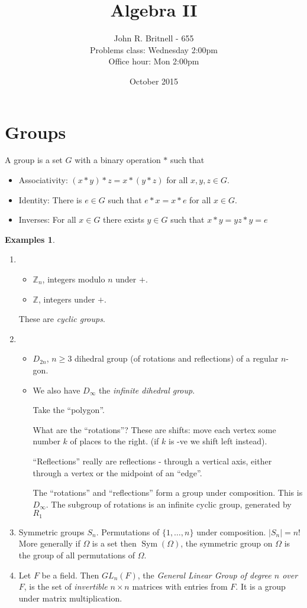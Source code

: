 \documentclass{article}
\title{Algebra II}
\author{John R. Britnell - 655\\
        Problems class: Wednesday 2:00pm\\
        Office hour: Mon 2:00pm}
\date{October 2015}
\theoremstyle{definition}
\newtheorem*{exmps}{Examples}
\DeclareMathOperator{\Sym}{Sym}
\begin{document}
\maketitle

\section{Groups}
A group is a set $G$ with a binary operation $*$ such that 
\begin{itemize}
\item Associativity: $(x * y)*z = x * (y * z)$ for all $x,y,z \in G$.
\item Identity: There is $e \in G$ such that $e * x = x * e$ for all $x \in G$.
\item Inverses: For all $x \in G$ there exists $y \in G$ such that $x * y = yz * y = e$\\
\end{itemize}

\begin{exmps}\hfill
\begin{enumerate}
\item
\begin{itemize}
\item $\mathbb{Z}_n$, integers modulo $n$ under $+$.
\item $\mathbb{Z}$, integers under $+$.
\end{itemize}
These are \emph{cyclic groups}.
\item
\begin{itemize}
\item $D_{2n}$, $n \geq 3$ dihedral group (of rotations and reflections) of a regular $n$-gon.
\item We also have $D_\infty$ the \emph{infinite dihedral group}.

Take the ``polygon''.

What are the ``rotations''? These are shifts: move each vertex some number $k$ of places to the right. (if $k$ is -ve we shift left instead). 

``Reflections'' really are reflections - through a vertical axis, either through a vertex or the midpoint of an ``edge''.

The ``rotations'' and ``reflections'' form a group under composition. This is $D_\infty$. The subgroup of rotations is an infinite cyclic group, generated by $R_1$

\end{itemize}
\item Symmetric groups $S_n$. Permutations of $\{1, \ldots, n\}$ under composition. $|S_n| = n!$
More generally if $\Omega$ is a set then $\Sym(\Omega)$, the symmetric group on $\Omega$ is the group of all permutations of $\Omega$.

\item Let $F$ be a field. Then $GL_n(F)$, the \emph{General Linear Group of degree $n$ over $F$}, is the set of \emph{invertible} $n \times n$ matrices with entries from $F$. It is a group under matrix multiplication. 
\end{enumerate}
  
\end{exmps}
\end{document}
